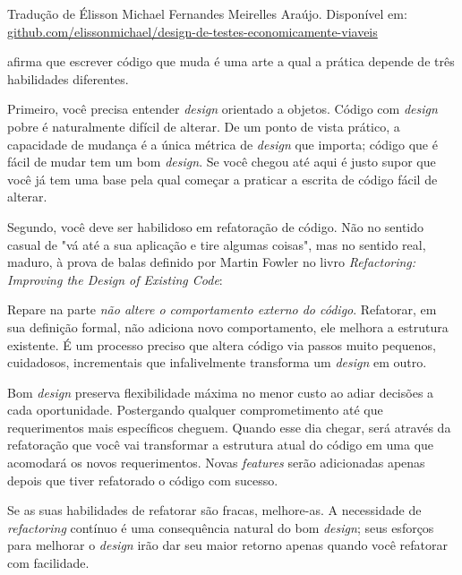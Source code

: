 
Tradução de Élisson Michael Fernandes Meirelles Araújo. Disponível em: \url{github.com/elissonmichael/design-de-testes-economicamente-viaveis}

\cite{Sandi} afirma que escrever código que muda é uma arte a qual a prática depende de três habilidades diferentes.

Primeiro, você precisa entender \textit{design} orientado a objetos. Código com \textit{design} pobre é naturalmente difícil de alterar. De um ponto de vista prático, a capacidade de mudança é a única métrica de \textit{design} que importa; código que é fácil de mudar tem um bom \textit{design}. Se você chegou até aqui é justo supor que você já tem uma base pela qual começar a praticar a escrita de código fácil de alterar.

Segundo, você deve ser habilidoso em refatoração de código. Não no sentido casual de "vá até a sua aplicação e tire algumas coisas", mas no sentido real, maduro, à prova de balas definido por Martin Fowler no livro \textit{Refactoring: Improving the Design of Existing Code}\cite{Fowler1999}:


Repare na parte \textit{não altere o comportamento externo do código}. Refatorar, em sua definição formal, não adiciona novo comportamento, ele melhora a estrutura existente. É um processo preciso que altera código via passos muito pequenos, cuidadosos, incrementais que infalivelmente transforma um \textit{design} em outro.

Bom \textit{design} preserva flexibilidade máxima no menor custo ao adiar decisões a cada oportunidade. Postergando qualquer comprometimento até que requerimentos mais específicos cheguem. Quando esse dia chegar, será através da refatoração que você vai transformar a estrutura atual do código em uma que acomodará os novos requerimentos. Novas \textit{features} serão adicionadas apenas depois que tiver refatorado o código com sucesso.

Se as suas habilidades de refatorar são fracas, melhore-as. A necessidade de  \textit{refactoring} contínuo é uma consequência natural do bom \textit{design}; seus esforços para melhorar o \textit{design} irão dar seu maior retorno apenas quando você refatorar com facilidade.

